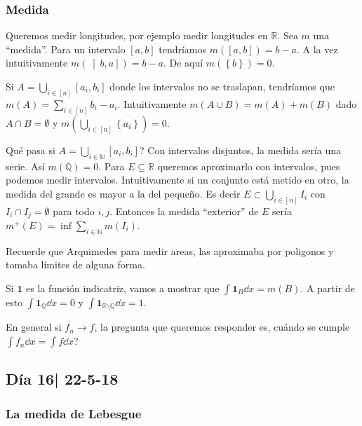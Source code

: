 \documentclass[12pt]{article}
\theoremstyle{plain}
\theoremstyle{definition}
\theoremstyle{remark}
\numberwithin{equation}{section}
\newcommand{\bN}{\mathbb{N}}        %
\newcommand{\bQ}{\mathbb{Q}}        %
\newcommand{\bR}{\mathbb{R}}        %
\renewcommand{\:}{\colon}           %
\newcommand{\conj}[1]{\left\lbrace#1\right\rbrace}
\newcommand{\bonj}[1]{\left\lbrack#1\right\rbrack}
\newcommand{\rbonj}[1]{\left\rbrack#1\right\rbrack}
\begin{document}
\begin{multicols}{2}
\subsubsection*{Medida}

Queremos medir longitudes, por ejemplo medir longitudes en $\bR$. Sea $m$ una ``medida''. Para un intervalo $\bonj{a,b}$ tendríamos $m(\bonj{a,b})=b-a$. A la vez intuitivamente $m(\rbonj{b,a})=b-a$. De aquí $m(\conj{b})=0$. \par
Si $A=\bigcup_{i\in\bonj{n}}\bonj{a_i,b_i}$ donde los intervalos no se traslapan, tendríamos que $m(A)=\sum_{i\in\bonj{n}}b_i-a_i$. Intuitivamente $m(A\cup B)=m(A)+m(B)$ dado $A\cap B=\emptyset$ y $m(\bigcup_{i\in\bonj{n}}\conj{a_i})=0$. \par
Qué pasa si $A=\bigcup_{i\in\bN}\bonj{a_i,b_i}$? Con intervalos disjuntos, la medida sería una serie. Así $m(\bQ)=0$. Para $E\subseteq\bR$ queremos aproximarlo con intervalos, pues podemos medir intervalos. Intuitivamente si un conjunto está metido en otro, la medida del grande es mayor a la del pequeño. Es decir $E\subset\bigcup_{i\in\bonj{n}}I_i$ con $I_i\cap I_j=\emptyset$ para todo $i,j$. Entonces la medida ``exterior'' de $E$ sería $m^+(E)=\inf\sum_{i\in\bN}m(I_i)$.\par
Recuerde que Arquimedes para medir areas, las aproximaba por poligonos y tomaba límites de alguna forma.\par
Si $\mathbf{1}$ es la función indicatriz, vamos a mostrar que $\int\mathbf{1}_B\dd x=m(B)$. A partir de esto $\int\mathbf{1}_{\bQ}\dd x=0$ y $\int\mathbf{1}_{\bR\setminus\bQ}\dd x=1$. \par
En general si $f_n\to f$, la pregunta que queremos responder es, cuándo se cumple $\int f_n\dd x=\int f\dd x$?


\subsection{Día 16| 22-5-18}

\subsubsection*{La medida de Lebesgue}


\end{multicols}
\end{document}
